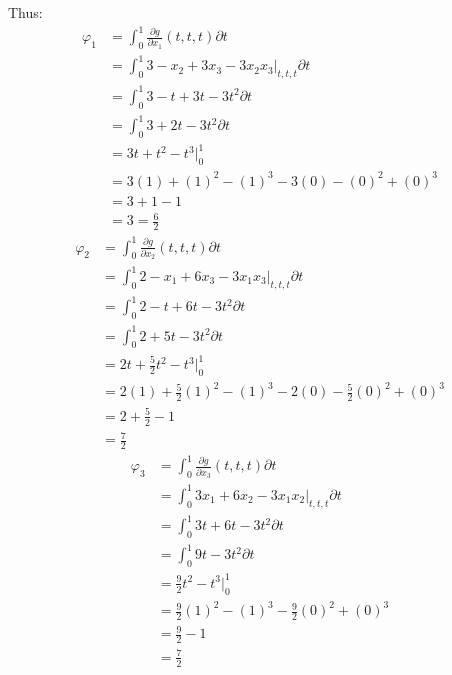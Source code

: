 \documentclass{article}
\begin{document}
\begin{enumerate}
\begin{enumerate}
  Thus:
  \begin{align*}
  \varphi_{1} &= \int_{0}^{1} \frac{\partial g}{\partial x_{1}} (t, t, t) \partial t \\ 
              &= \int_{0}^{1} 3 - x_{2}  + 3x_{3} - 3x_{2}x_{3} \Big|_{t, t, t} \partial t \\ 
              &= \int_{0}^{1} 3 - t  + 3t - 3t^{2} \partial t \\ 
              &= \int_{0}^{1} 3 + 2t - 3t^{2} \partial t \\ 
              &= 3t + t^{2}  - t^{3} \Big|_{0}^{1} \\ 
              &= 3(1) + (1)^{2} - (1)^{3} - 3(0) - (0)^{2} + (0)^{3} \\ 
              &= 3 + 1 - 1 \\ 
              &= 3 = \frac{6}{2}
  \end{align*}
  \begin{align*}
  \varphi_{2} &= \int_{0}^{1} \frac{\partial g}{\partial x_{2}} (t, t, t) \partial t \\ 
              &= \int_{0}^{1} 2 - x_{1}  + 6x_{3} - 3x_{1}x_{3} \Big|_{t, t, t} \partial t \\ 
              &= \int_{0}^{1} 2 - t  + 6t - 3t^{2} \partial t \\ 
              &= \int_{0}^{1} 2 + 5t - 3t^{2} \partial t \\ 
              &= 2t + \frac{5}{2}t^{2}  - t^{3} \Big|_{0}^{1} \\ 
              &= 2(1) + \frac{5}{2}(1)^{2} - (1)^{3} - 2(0) - \frac{5}{2}(0)^{2} + (0)^{3} \\ 
              &= 2 + \frac{5}{2} - 1 \\ 
              &= \frac{7}{2}
  \end{align*}
  \begin{align*}
  \varphi_{3} &= \int_{0}^{1} \frac{\partial g}{\partial x_{3}} (t, t, t) \partial t \\ 
              &= \int_{0}^{1} 3x_{1}  + 6x_{2} - 3x_{1}x_{2} \Big|_{t, t, t} \partial t \\ 
              &= \int_{0}^{1} 3t  + 6t - 3t^{2} \partial t \\ 
              &= \int_{0}^{1} 9t - 3t^{2} \partial t \\ 
              &= \frac{9}{2}t^{2}  - t^{3} \Big|_{0}^{1} \\ 
              &= \frac{9}{2}(1)^{2} - (1)^{3} - \frac{9}{2}(0)^{2} + (0)^{3} \\ 
              &= \frac{9}{2} - 1 \\ 
              &= \frac{7}{2}
  \end{align*}


\end{enumerate}
\end{enumerate}
\end{document}
